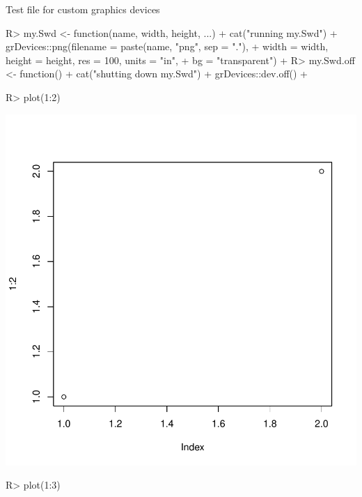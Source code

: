 Test file for custom graphics devices
\begin{Schunk}
\begin{Sinput}
R> my.Swd <- function(name, width, height, ...) {
+    cat("running my.Swd\n")
+    grDevices::png(filename = paste(name, "png", sep = "."),
+                   width = width, height = height, res = 100, units = "in",
+                   bg = "transparent")
+  }
R> my.Swd.off <- function() {
+      cat("shutting down my.Swd\n")
+      grDevices::dev.off()
+  }
\end{Sinput}
\end{Schunk}
\begin{Schunk}
\begin{Sinput}
R> plot(1:2)
\end{Sinput}
\end{Schunk}
\includegraphics{customgraphics-002}
\begin{Schunk}
\begin{Sinput}
R> plot(1:3)
\end{Sinput}
\end{Schunk}
